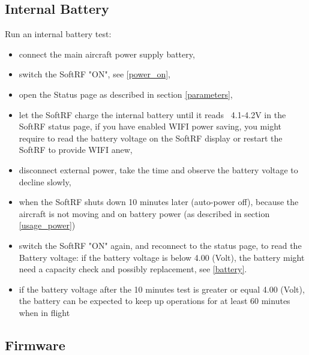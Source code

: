 \documentclass[10pt,a4paper]{article}
\begin{document}
\subsection{Internal Battery}\label{maint_battery}
Run an internal battery test:

\begin{itemize}
\item connect the main aircraft power supply battery,
\item switch the SoftRF "ON", see \ref{power_on},
\item open the Status page as described in section \ref{parameters},
\item let the SoftRF charge the internal battery until it reads ~4.1-4.2V in the SoftRF status page, if you have enabled WIFI power saving, you might require to read the battery voltage on the SoftRF display or restart the SoftRF to provide WIFI anew,
\item disconnect external power, take the time and observe the battery voltage to decline slowly,
\item when the SoftRF shuts down 10 minutes later (auto-power off), because the aircraft is not moving and on battery power (as described in section \ref{usage_power})
\item switch the SoftRF "ON" again, and reconnect to the status page, to read the Battery voltage: if the battery voltage is below 4.00 (Volt), the battery might need a capacity check and possibly replacement, see \ref{battery}.
\item if the battery voltage after the 10 minutes test is greater or equal 4.00 (Volt), the battery can be expected to keep up operations for at least 60 minutes when in flight
\end{itemize}

\subsection{Firmware}
\end{document}
